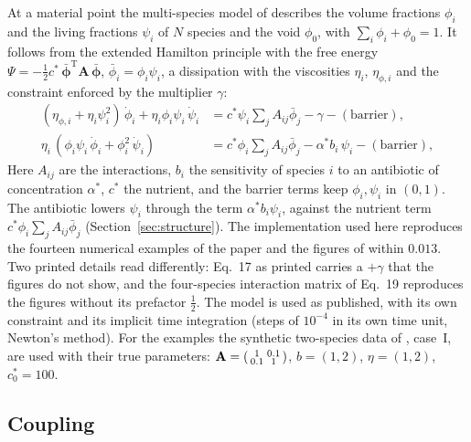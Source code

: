 \documentclass[11pt,a4paper]{article}
\begin{document}
At a material point the multi-species model of \citet{Klempt2026ContinuumBacterialGrowth} describes the volume fractions $\phi_i$ and the living fractions $\psi_i$ of $N$ species and the void $\phi_0$, with $\sum_i\phi_i+\phi_0=1$. It follows from the extended Hamilton principle with the free energy $\Psi=-\tfrac12c^*\,\bar{\bm\phi}^{\mathrm T}\mathbf A\,\bar{\bm\phi}$, $\bar\phi_i=\phi_i\psi_i$, a dissipation with the viscosities $\eta_i$, $\eta_{\phi,i}$ and the constraint enforced by the multiplier $\gamma$:
\begin{equation}
\begin{aligned}
(\eta_{\phi,i}+\eta_i\psi_i^2)\,\dot\phi_i+\eta_i\phi_i\psi_i\,\dot\psi_i
&= c^*\psi_i\textstyle\sum_j A_{ij}\bar\phi_j-\gamma-(\text{barrier}),\\
\eta_i\,(\phi_i\psi_i\,\dot\phi_i+\phi_i^2\,\dot\psi_i)
&= c^*\phi_i\textstyle\sum_j A_{ij}\bar\phi_j-\alpha^* b_i\,\psi_i-(\text{barrier}),
\end{aligned}
\label{eq:point}
\end{equation}
Here $A_{ij}$ are the interactions, $b_i$ the sensitivity of species $i$ to an antibiotic of concentration $\alpha^*$, $c^*$ the nutrient, and the barrier terms keep $\phi_i,\psi_i$ in $(0,1)$. The antibiotic lowers $\psi_i$ through the term $\alpha^*b_i\psi_i$, against the nutrient term $c^*\phi_i\sum_jA_{ij}\bar\phi_j$ (Section~\ref{sec:structure}). The implementation used here reproduces the fourteen numerical examples of the paper and the figures of \citet{Fritsch2025BayesianMicrofilms} within $0.013$. Two printed details read differently: Eq.~17 as printed carries a $+\gamma$ that the figures do not show, and the four-species interaction matrix of Eq.~19 reproduces the figures without its prefactor $\tfrac12$. The model is used as published, with its own constraint and its implicit time integration (steps of $10^{-4}$ in its own time unit, Newton's method). For the examples the synthetic two-species data of \citet{Fritsch2025BayesianMicrofilms}, case~I, are used with their true parameters: $\mathbf A=\begin{psmallmatrix}1&0.1\\0.1&1\end{psmallmatrix}$, $b=(1,2)$, $\eta=(1,2)$, $c^*_0=100$.

\subsection{Coupling}
\label{sec:coupling}
\end{document}
